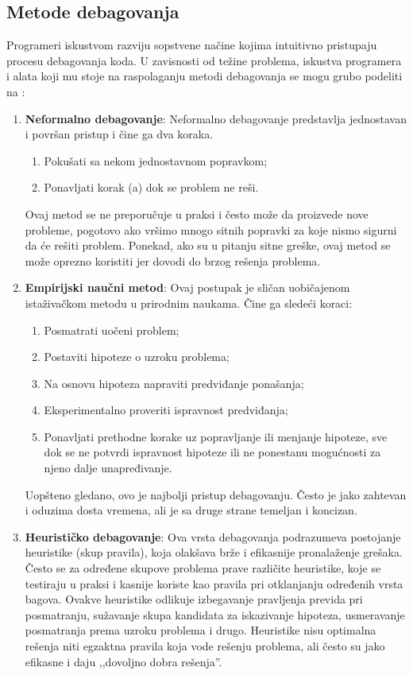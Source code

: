 \documentclass[a4paper]{article}
\begin{document}
\subsection{Metode debagovanja}
\label{subsec:podnaslov2}
Programeri iskustvom razviju sopstvene načine kojima intuitivno pristupaju procesu debagovanja koda. U zavisnosti od težine problema, iskustva programera i alata koji mu stoje na raspolaganju metodi debagovanja se mogu grubo podeliti na \cite{bagovi_smalkov}:
\begin{enumerate}
\item \textbf{Neformalno debagovanje}: Neformalno debagovanje predstavlja jednostavan i površan pristup i čine ga dva koraka.
  \begin{enumerate}
  \item Pokušati sa nekom jednostavnom popravkom;
  \item Ponavljati korak (a) dok se problem ne reši.
  \end{enumerate}
  Ovaj metod se ne preporučuje u praksi i često može da proizvede nove probleme, pogotovo ako vršimo mnogo sitnih popravki za koje nismo sigurni da će rešiti problem. Ponekad, ako su u pitanju sitne greške, ovaj metod se može oprezno koristiti jer dovodi do brzog rešenja problema.
  
\item \textbf{Empirijski naučni metod}:
  Ovaj postupak je sličan uobičajenom istaživačkom metodu u prirodnim naukama.
  Čine ga sledeći koraci:
  \begin{enumerate}
  \item Posmatrati uočeni problem;
  \item Postaviti hipoteze o uzroku problema;
  \item Na osnovu hipoteza napraviti predviđanje ponašanja;
  \item Eksperimentalno proveriti ispravnost predviđanja;
  \item Ponavljati prethodne korake uz popravljanje ili menjanje hipoteze, sve dok se ne potvrdi ispravnost hipoteze ili ne ponestanu mogućnosti za njeno dalje unapređivanje.
  \end{enumerate}
  \indent Uopšteno gledano, ovo je najbolji pristup debagovanju. Često je jako zahtevan i oduzima dosta vremena, ali je sa druge strane temeljan i koncizan.
  
  
\item \textbf{Heurističko debagovanje}: Ova vrsta debagovanja podrazumeva postojanje heuristike (skup pravila), koja olakšava brže i efikasnije pronalaženje grešaka. Često se za određene skupove problema prave različite heuristike, koje se testiraju u praksi i kasnije koriste kao pravila pri otklanjanju određenih vrsta bagova. Ovakve heuristike odlikuje izbegavanje pravljenja previda pri posmatranju, sužavanje skupa kandidata za iskazivanje hipoteza, usmeravanje posmatranja prema uzroku problema i drugo. Heuristike nisu optimalna rešenja niti egzaktna pravila koja vode rešenju problema, ali često su jako efikasne i daju ,,dovoljno dobra rešenja''.
\end{enumerate}
\end{document}
